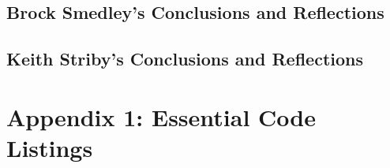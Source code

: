 \documentclass[letterpaper,10pt,serif,draftclsnofoot,onecolumn,compsoc,titlepage]{IEEEtran}
\begin{document}
		

	\newpage

	\subsection{Brock Smedley's Conclusions and Reflections}

		

	\newpage
	
	\subsection{Keith Striby's Conclusions and Reflections}

		

	\newpage

\section{Appendix 1: Essential Code Listings}


\nocite{*}
\newpage


\end{document}
